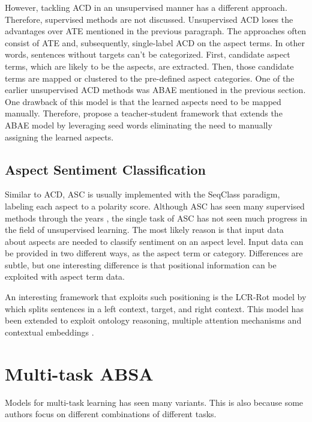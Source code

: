 \documentclass[american, oneside]{ecsgdp}
\begin{document}
However, tackling ACD in an unsupervised manner has a different approach. Therefore, supervised methods are not discussed. Unsupervised ACD loses the advantages over ATE mentioned in the previous paragraph. The approaches often consist of ATE and, subsequently, single-label ACD on the aspect terms. In other words, sentences without targets can't be categorized. First, candidate aspect terms, which are likely to be the aspects, are extracted. Then, those candidate terms are mapped or clustered to the pre-defined aspect categories. One of the earlier unsupervised ACD methods was ABAE mentioned in the previous section. One drawback of this model is that the learned aspects need to be mapped manually. Therefore, \textcite{Karamanolakis2019Seed} propose a teacher-student framework that extends the ABAE model by leveraging seed words eliminating the need to manually assigning the learned aspects. %

\subsection{Aspect Sentiment Classification} \label{sec:ASC}
Similar to ACD, ASC is usually implemented with the SeqClass paradigm, labeling each aspect to a polarity score. Although ASC has seen many supervised methods through the years \parencite{Zhang2022Survey}, the single task of ASC has not seen much progress in the field of unsupervised learning. The most likely reason is that input data about aspects are needed to classify sentiment on an aspect level. Input data can be provided in two different ways, as the aspect term or category. Differences are subtle, but one interesting difference is that positional information can be exploited with aspect term data.

An interesting framework that exploits such positioning is the LCR-Rot model by \textcite{Zheng2018LCR-Rot} which splits sentences in a left context, target, and right context. This model has been extended to exploit ontology reasoning, multiple attention mechanisms and contextual embeddings \parencite{Schouten2017Ontology, Wallaart2019HAABSA, Trusca2020HAABSA++}.

\section{Multi-task ABSA} \label{sec:multi-task}

Models for multi-task learning has seen many variants. This is also because some authors focus on different combinations of different tasks. 
\end{document}
